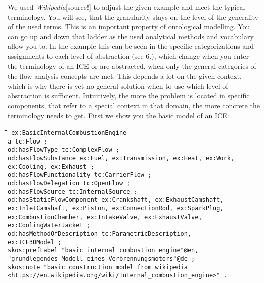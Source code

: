 \documentclass[a4paper,11pt]{article}
\newenvironment{code}{\tt \begin{tabbing}
\hskip12pt\=\hskip12pt\=\hskip12pt\=\hskip12pt\=\hskip5cm\=\hskip5cm\=\kill}
{\end{tabbing}}
\begin{document}
\begin{itemize}
    We used \emph{Wikipedia}[source!] to adjust the given example and meet the
    typical terminology. You will see, that the granularity stays on the level
    of the generality of the used terms. This is an important property of 
    ontological modelling. You can go up and down that ladder as the used
    analytical methods and vocabulary allow you to. In the example this can be
    seen in the specific categorizations and assignments to each level of 
    abstraction (see 6.), which change when you enter the terminology of
    an ICE or are abstracted, when only the general categories of the 
    flow analysis concepts are met. This depends a lot on the given context,
    which is why there is yet no general solution when to use which level of 
    abstraction is sufficient. Intuitively, the more the problem is located
    in specific components, that refer to a special context in that domain,
    the more concrete the terminology needs to get.
    \newpage
    First we show you the basic model of an ICE:
    \begin{code}\tt
        ex:BasicInternalCombustionEngine \\
        \> a tc:Flow ; \\
        \> od:hasFlowType tc:ComplexFlow ; \\
        \> od:hasFlowSubstance ex:Fuel, ex:Transmission, ex:Heat, ex:Work, \\
        \> ex:Cooling, ex:Exhaust ; \\
        \> od:hasFlowFunctionality tc:CarrierFlow ; \\
        \> od:hasFlowDelegation tc:OpenFlow ; \\
        \> od:hasFlowSource tc:InternalSource ; \\
        \> od:hasStaticFlowComponent ex:Crankshaft, ex:ExhaustCamshaft, \\
        \> ex:InletCamshaft, ex:Piston, ex:ConnectionRod, ex:SparkPlug, \\
        \> ex:CombustionChamber, ex:IntakeValve, ex:ExhaustValve, \\
        \> ex:CoolingWaterJacket ; \\
        \> od:hasMethodOfDescription tc:ParametricDescription, \\
        \> ex:ICE3DModel ; \\
        \> skos:prefLabel "basic internal combustion engine"@en, \\
        \> "grundlegendes Modell eines Verbrennungsmotors"@de  ; \\
        \> skos:note "basic construction model from wikipedia \\
        \> <https://en.wikipedia.org/wiki/Internal\_combustion\_engine>" . \\
    \end{code}


\end{itemize}
\end{document}
